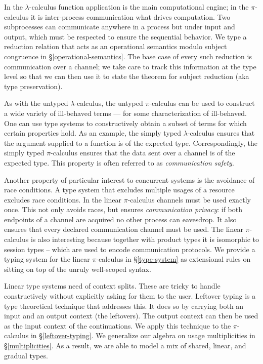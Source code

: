 \documentclass[a4paper,UKenglish,cleveref, autoref, thm-restate,authorcolumns]{lipics-v2019}
\theoremstyle{definition}
\newcommand{\lambdacalc}{$\lambda$-calculus}
\newcommand{\picalc}{$\pi$-calculus}
\begin{document}
In the \lambdacalc{} function application is the main computational engine; in the \picalc{} it is inter-process communication what drives computation.
Two subprocesses can communicate anywhere in a process but under input and output, which must be respected to ensure the sequential behavior.
We type a reduction relation that acts as an operational semantics modulo subject congruence in \S \ref{operational-semantics}.
The base case of every such reduction is communication over a channel; we take care to track this information at the type level so that we can then use it to state the theorem for subject reduction (aka type preservation).

As with the untyped \lambdacalc{}, the untyped \picalc{} can be used to construct a wide variety of ill-behaved terms --- for some characterization of ill-behaved.
One can use type systems to constructively obtain a subset of terms for which certain properties hold.
As an example, the simply typed \lambdacalc{} ensures that the argument supplied to a function is of the expected type.
Correspondingly, the simply typed \picalc{} \cite{} ensures that the data sent over a channel is of the expected type.
This property is often referred to as \emph{communication safety}.

Another property of particular interest to concurrent systems is the avoidance of race conditions.
A type system that excludes multiple usages of a resource excludes race conditions.
In the linear \picalc{} \cite{} channels must be used exactly once.
This not only avoids races, but ensures \emph{communication privacy}: if both endpoints of a channel are acquired no other process can eavesdrop.
It also ensures that every declared communication channel must be used.
The linear \picalc{} is also interesting because together with product types it is isomorphic to session types \cite{} -- which are used to encode communication protocols.
We provide a typing system for the linear \picalc{} in \S \ref{type-system} as extensional rules on sitting on top of the unruly well-scoped syntax.

Linear type systems need of context splits.
These are tricky to handle constructively without explicitly asking for them to the user.
Leftover typing \cite{} is a type theoretical technique that addresses this.
It does so by carrying both an input and an output context (the leftovers).
The output context can then be used as the input context of the continuations.
We apply this technique to the \picalc{} in \S \ref{leftover-typing}.
We generalize our algebra on usage multiplicities in \S \ref{multiplicities}.
As a result, we are able to model a mix of shared, linear, and gradual types.
\end{document}
